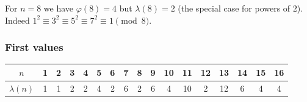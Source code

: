 For $n = 8$ we have $\varphi(8) = 4$ but $\lambda(8) = 2$ (the special case for powers of
$2$). Indeed $1^{2} \equiv 3^{2} \equiv 5^{2} \equiv 7^{2} \equiv 1 \pmod{8}$.

\subsubsection{First values}

\begin{center}
\begin{tabular}{c|cccccccccccccccc}
$n$           & 1 & 2 & 3 & 4 & 5 & 6 & 7 & 8 & 9 & 10 & 11 & 12 & 13 & 14 & 15 & 16 \\
\hline
$\lambda(n)$  & 1 & 1 & 2 & 2 & 4 & 2 & 6 & 2 & 6 & 4  & 10 & 2  & 12 & 6  & 4  & 4
\end{tabular}
\end{center}
